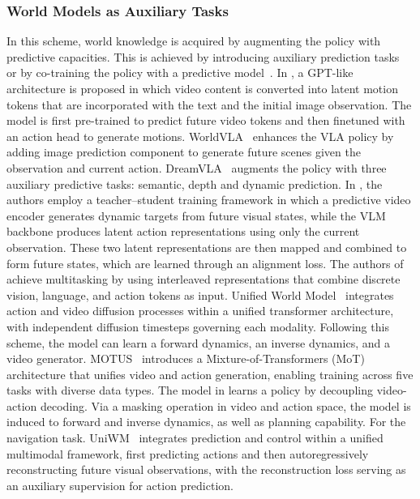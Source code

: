 \documentclass{article}
\begin{document}
\subsubsection{World Models as Auxiliary Tasks}
In this scheme, world knowledge is acquired by augmenting the policy with predictive capacities. This is achieved by introducing auxiliary prediction tasks~\citep{Chen_2025_ICCV,cen2025worldvla,zhang2025dreamvla,sun2026vla,wang2026unified} or by co-training the policy with a predictive model~\citep{wang2026unified,li2025unified}. In \citet{Chen_2025_ICCV}, a GPT-like architecture is proposed in which video content is converted into latent motion tokens that are incorporated with the text and the initial image observation. The model is first pre-trained to predict future video tokens and then finetuned with an action head to generate motions. WorldVLA~\citep{cen2025worldvla} enhances the VLA policy by adding image prediction component to generate future scenes given the observation and current action. DreamVLA~\citep{zhang2025dreamvla} augments the policy with three auxiliary predictive tasks: semantic, depth and dynamic prediction. In \citet{sun2026vla}, the authors employ a teacher–student training framework in which a predictive video encoder generates dynamic targets from future visual states, while the VLM backbone produces latent action representations using only the current observation. These two latent representations are then mapped and combined to form future states, which are learned through an alignment loss. The authors of \citet{wang2026unified} achieve multitasking by using interleaved representations that combine discrete vision, language, and action tokens as input. Unified World Model~\citep{zhu2025unified} integrates action and video diffusion processes within a unified transformer architecture, with independent diffusion timesteps governing each modality. Following this scheme, the model can learn a forward dynamics, an inverse dynamics, and a video generator. MOTUS~\citep{bi2025motus} introduces a Mixture-of-Transformers (MoT) architecture that unifies video and action generation, enabling training across five tasks with diverse data types. The model in \citet{li2025unified} learns a policy by decoupling video-action decoding. Via a masking operation in video and action space, the model is induced to forward and inverse dynamics, as well as planning capability. For the navigation task. UniWM~\cite{dong2025unified} integrates prediction and control within a unified multimodal framework, first predicting actions and then autoregressively reconstructing future visual observations, with the reconstruction loss serving as an auxiliary supervision for action prediction.
\end{document}
